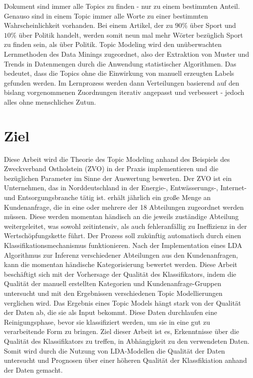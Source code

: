 \documentclass[german,version-2020-11]{uzl-thesis}
\begin{document}
Dokument sind immer alle Topics zu finden - nur zu einem bestimmten Anteil. Genauso sind in einem Topic immer alle Worte zu einer bestimmten Wahrscheinlichkeit vorhanden. Bei einem Artikel, der zu $90\%$ über Sport und $10\%$ über Politik handelt, werden somit neun mal mehr Wörter bezüglich Sport zu finden sein, als über Politik. Topic Modeling wird den unüberwachten Lernmethoden des Data Minings zugeordnet, also der Extraktion von Muster und Trends in Datenmengen durch die Anwendung statistischer Algorithmen. Das bedeutet, dass die Topics ohne die Einwirkung von manuell erzeugten Labels gefunden werden. Im Lernprozess werden dann Verteilungen basierend auf den bislang vorgenommenen Zuordnungen iterativ angepasst und verbessert - jedoch alles ohne menschliches Zutun. 

\section{Ziel}
Diese Arbeit wird die Theorie des Topic Modeling anhand des Beispiels des Zweckverband Ostholstein (ZVO) in der Praxis implementieren und die bezüglichen Parameter im Sinne der Auswertung bewerten. Der ZVO ist ein Unternehmen, das in Norddeutschland in der Energie-, Entwässerungs-, Internet- und Entsorgungsbranche tätig ist.  erhält jährlich ein große Menge an Kundenanfrage, die in eine oder mehrere der 18 Abteilungen zugeordnet werden müssen. Diese werden momentan händisch an die jeweils zuständige Abteilung weitergeleitet, was sowohl zeitintensiv, als auch fehleranfällig zu Ineffizienz in der Wertschöpfungskette führt. Der Prozess soll zukünftig automatisch durch einen Klassifikationsmechanismus funktionieren. Nach der Implementation eines LDA Algorithmus zur Inferenz verschiedener Abteilungen aus den Kundenanfragen, kann die momentan händische Kategorisierung bewertet werden. Diese Arbeit beschäftigt sich mit der Vorhersage der Qualität des Klassifikators, indem die Qualität der manuell erstellten Kategorien und Kundenanfrage-Gruppen untersucht und mit den Ergebnissen verschiedenen Topic Modellierungen verglichen wird. Das Ergebnis eines Topic Models hängt stark von der Qualität der Daten ab, die sie als Input bekommt. Diese Daten durchlaufen eine Reinigungsphase, bevor sie klassifiziert werden, um sie in eine gut zu verarbeitende Form zu bringen. Ziel dieser Arbeit ist es, Erkenntnisse über die Qualität des Klassifikators zu treffen, in Abhängigkeit zu den verwendeten Daten. Somit wird durch die Nutzung von LDA-Modellen die Qualität der Daten untersucht und Prognosen über einer höheren Qualität der Klassfikiation anhand der Daten gemacht. 
\end{document}
